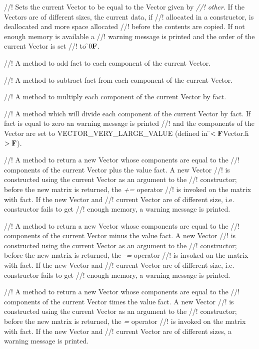 //! Sets the current Vector to be equal to the Vector given by {\em
//! other}. If the Vectors are of different sizes, the current data, if
//! allocated in a constructor, is deallocated and more space allocated
//! before the contents are copied. If not enough memory is available a
//! warning message is printed and the order of the current Vector is set
//! to \f$0{\bf F}$. 

//! A method to add \p fact to each component of the current Vector.

//! A method to subtract \p fact from each component of the current Vector.

//! A method to multiply each component of the current Vector by fact.

//! A method which will divide each component of the current Vector by
\p fact. If \p fact is equal to zero an warning message is printed
//! and the components of the Vector are set to VECTOR\_VERY\_LARGE\_VALUE
(defined in \f$<{\bf F}$Vector.h\f$>{\bf F}$).

//! A method to return a new Vector whose components are equal to the
//! components of the current Vector plus the value \p fact. A new Vector
//! is constructed using the current Vector as an argument to the
//! constructor; before the new matrix is returned, the {\em +=} operator
//! is invoked on the matrix with \p fact. If the new Vector and
//! current Vector are of different size, i.e. constructor fails to get
//! enough memory, a warning message is printed. 

//! A method to return a new Vector whose components are equal to the
//! components of the current Vector minus the value \p fact.  A new Vector
//! is constructed using the current Vector as an argument to the
//! constructor; before the new matrix is returned, the {\em -=} operator
//! is invoked on the matrix with \p fact. If the new Vector and
//! current Vector are of different size, i.e. constructor fails to get
//! enough memory, a warning message is printed. 


//! A method to return a new Vector whose components are equal to the
//! components of the current Vector times the value \p fact.  A new Vector
//! is constructed using the current Vector as an argument to the
//! constructor; before the new matrix is returned, the {\em *=} operator
//! is invoked on the matrix with \p fact. If the new Vector and
//! current Vector are of different sizes, a warning message is printed.


